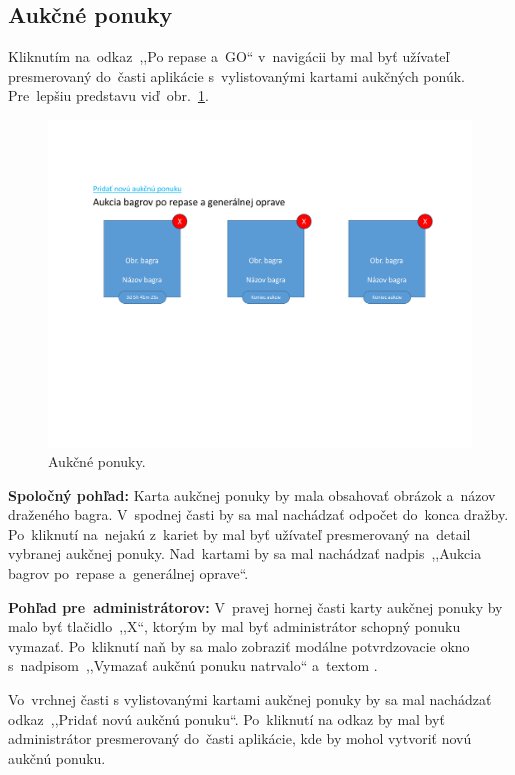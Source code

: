 \subsection{Aukčné ponuky}
\label{aukcne ponuky}

Kliknutím na~odkaz~,,Po repase a~GO`` v~navigácii by mal byť užívateľ presmerovaný do~časti aplikácie s~vylistovanými kartami aukčných ponúk. Pre~lepšiu predstavu viď~obr.~\ref{auction offer cards}.

\begin{figure}[H]\centering
\includegraphics[width=140mm]{../img/UI concept/auction offer cards}
\caption{Aukčné ponuky.}
\label{auction offer cards}
\end{figure}

\textbf{Spoločný pohľad:} Karta aukčnej ponuky by mala obsahovať obrázok a~názov draženého bagra. V~spodnej časti by sa mal nachádzať odpočet do~konca dražby. Po~kliknutí na~nejakú z~kariet by mal byť užívateľ presmerovaný na~detail vybranej aukčnej ponuky. Nad~kartami by sa mal nachádzať nadpis~,,Aukcia bagrov po~repase a~generálnej oprave``.

\textbf{Pohľad pre~administrátorov:} V~pravej hornej časti karty aukčnej ponuky by malo byť tlačidlo~,,X``, ktorým by mal byť administrátor schopný ponuku vymazať. Po~kliknutí naň by sa malo zobraziť modálne potvrdzovacie okno s~nadpisom~,,Vymazať aukčnú ponuku natrvalo`` a~textom .

Vo~vrchnej časti s vylistovanými kartami aukčnej ponuky by sa mal nachádzať odkaz~,,Pridať novú aukčnú ponuku``. Po~kliknutí na odkaz by mal byť administrátor presmerovaný do~časti aplikácie, kde by mohol vytvoriť novú aukčnú ponuku.

